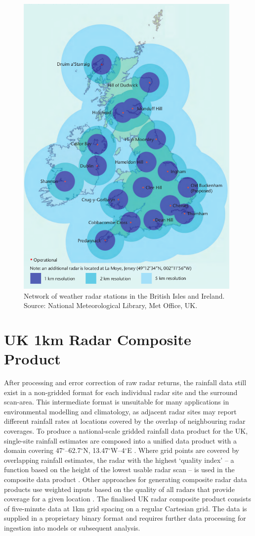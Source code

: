 \begin{figure}[htb]
\includegraphics[width=11cm]{chp_radar/radar.png}
\caption{Network of weather radar stations in the British Isles and Ireland. Source: National Meteorological Library, Met Office, UK.}
\label{fig_radar_map}
\end{figure}


\section{UK 1km Radar Composite Product}
After processing and error correction of raw radar returns, the rainfall data still exist in a non-gridded format for each individual radar site and the surround scan-area. This intermediate format is unsuitable for many applications in environmental modelling and climatology, as adjacent radar sites may report different rainfall rates at locations covered by the overlap of neighbouring radar coverages. To produce a national-scale gridded rainfall data product for the UK, single-site rainfall estimates are composed into a unified data product with a domain covering 47$^{\circ}$--62.7$^{\circ}$N, 13.47$^{\circ}$W--4$^{\circ}$E \citep{metoffice2003nimrod}. Where grid points are covered by overlapping rainfall estimates, the radar with the highest `quality index' -- a function based on the height of the lowest usable radar scan -- is used in the composite data product \citep{harrison2009high}. Other approaches for generating composite radar data products use weighted inputs based on the quality of all radars that provide coverage for a given location \citep{peura2007using}. The finalised UK radar composite product consists of five-minute data at 1km grid spacing on a regular Cartesian grid. The data is supplied in a proprietary binary format and requires further data processing for ingestion into models or subsequent analysis. %

